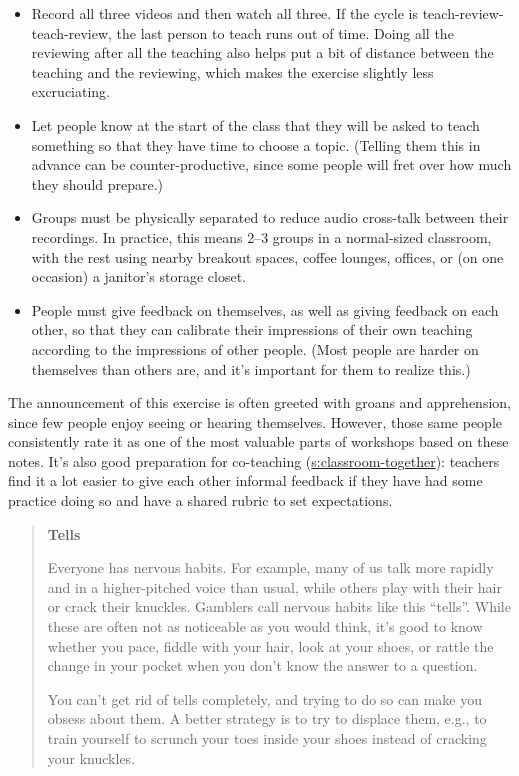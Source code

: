 \begin{itemize}
\item
  Record all three videos and then watch all three. If the cycle is
  teach-review-teach-review, the last person to teach runs out of
  time. Doing all the reviewing after all the teaching also helps put
  a bit of distance between the teaching and the reviewing, which
  makes the exercise slightly less excruciating.
\item
  Let people know at the start of the class that they will be asked to
  teach something so that they have time to choose a topic. (Telling
  them this in advance can be counter-productive, since some people
  will fret over how much they should prepare.)
\item
  Groups must be physically separated to reduce audio cross-talk
  between their recordings. In practice, this means 2--3 groups in a
  normal-sized classroom, with the rest using nearby breakout spaces,
  coffee lounges, offices, or (on one occasion) a janitor's storage
  closet.
\item
  People must give feedback on themselves, as well as giving feedback
  on each other, so that they can calibrate their impressions of their
  own teaching according to the impressions of other people. (Most
  people are harder on themselves than others are, and it's important
  for them to realize this.)
\end{itemize}

The announcement of this exercise is often greeted with groans and
apprehension, since few people enjoy seeing or hearing themselves.
However, those same people consistently rate it as one of the most
valuable parts of workshops based on these notes. It's also good
preparation for co-teaching (\protect\hyperlink{SECTION}{s:classroom-together}):
teachers find it a lot easier to give each other informal feedback if
they have had some practice doing so and have a shared rubric to set
expectations.

\begin{quote}\setlength{\parindent}{0pt}
\textbf{Tells}

Everyone has nervous habits. For example, many of us talk more rapidly
and in a higher-pitched voice than usual, while others play with their
hair or crack their knuckles. Gamblers call nervous habits like this
``tells''. While these are often not as noticeable as you would think,
it's good to know whether you pace, fiddle with your hair, look at
your shoes, or rattle the change in your pocket when you don't know
the answer to a question.

You can't get rid of tells completely, and trying to do so can make
you obsess about them. A better strategy is to try to displace them,
e.g., to train yourself to scrunch your toes inside your shoes instead
of cracking your knuckles.
\end{quote}

